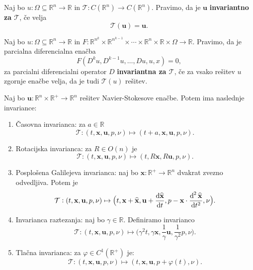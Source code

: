 \documentclass[mat2, tisk]{fmfdelo}
\newcommand{\R}{\mathbb R}
\newcommand{\bd}{\textbf}
\begin{document}
\begin{definicija}
Naj bo $u: \Omega \subseteq \R^n \rightarrow \R$
in $\mathcal{T}:C(\R^n) \rightarrow C(\R^n)$. Pravimo, da je $\bd{u}$
\bd{invariantno za $\mathcal{T}$}, če velja
\begin{equation*}
\mathcal{T}(\bd{u}) = \bd{u}.
\end{equation*}
\end{definicija}

\begin{definicija}
Naj bo $u: \Omega \subseteq \R^n \rightarrow \R$ in 
$F: \R^{n^k} \times \R^{n^{k-1}} \times \cdots \times\R^n \times \R \times \Omega \rightarrow \R$. 
Pravimo, da je parcialna diferencialna enačba 
$$
F(D^k u, D^{k-1}u, \dots, D u, u, x) = 0,
$$
za parcialni diferencialni operator $D$ \bd{invariantna za $\mathcal{T}$}, če za 
vsako rešitev $u$ zgornje enačbe velja, da je tudi $\mathcal{T}(u)$ rešitev.
\end{definicija}

\begin{trditev}
Naj bo $\bd{u}: \R^n \times \R^+ \rightarrow \R^n$ rešitev Navier-Stokesove enačbe. 
Potem ima naslednje invariance: 
\begin{enumerate}
  \item[i)] Časovna invarianca: za $a\in \R$ $$\mathcal{T}: (t, \bd{x}, \bd{u}, p, \nu) \mapsto (t + a, \bd{x}, \bd{u}, p, \nu).$$
  \item[ii)] Rotacijska invarianca: za $R \in O(n)$ je $$\mathcal{T}: (t, \bd{x}, \bd{u}, p, \nu) \mapsto (t, R\bd{x}, R\bd{u}, p, \nu).$$


  \item[iii)] Posplošena Galilejeva invarianca: naj bo $\widehat{\bd{x}}: \R^+ \rightarrow \R^n$ dvakrat zvezno odvedljiva. Potem je 
  $$\mathcal{T}: (t, \bd{x}, \bd{u}, p, \nu) \mapsto \big(t, \bd{x} + \widehat{\bd{x}}, \bd{u} + \frac{\dif \widehat{\bd{x}}}{\dif t}, p - \bd{x} \cdot \frac{\dif^{\,2} \widehat{\bd{x}}}{\dif t^2}, \nu\big).$$
  \label{galilejeva_invarianca}
  \item[iv)] Invarianca raztezanja: naj bo $\gamma\in \R$. Definiramo invarianco 
  $$\mathcal{T}: (t, \bd{x}, \bd{u}, p, \nu) \mapsto \big(\gamma^2 t, \gamma\bd{x}, \frac{1}{\gamma} \bd{u}, \frac{1}{\gamma^2} p, \nu\big).$$
  \item[v)] Tlačna invarianca: za $\varphi \in C^1(\R^+)$ je: 
  $$\mathcal{T}: (t, \bd{x}, \bd{u}, p, \nu) \mapsto (t, \bd{x}, \bd{u}, p + \varphi(t), \nu). $$
\end{enumerate}
\end{trditev}
\end{document}
